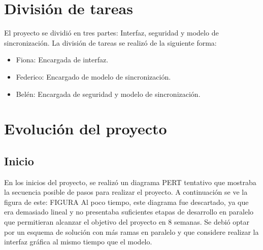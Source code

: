 \documentclass{article}
\begin{document}
\section{División de tareas}

	El proyecto se dividió en tres partes: Interfaz, seguridad y modelo de sincronización. La división de tareas se realizó de la siguiente forma:
\begin{itemize}
\item Fiona: Encargada de interfaz.
\item Federico: Encargado de modelo de sincronización.
\item Belén: Encargada de seguridad y modelo de sincronización.
\end{itemize}
\bigskip




\section{Evolución del proyecto}

\subsection{Inicio}
\smallskip

	En los inicios del proyecto, se realizó un diagrama PERT tentativo que mostraba la secuencia posible de pasos para realizar el proyecto. A continuación se ve la figura de este:
FIGURA
	Al poco tiempo, este diagrama fue descartado, ya que era demasiado lineal y no presentaba suficientes etapas de desarrollo en paralelo que permitieran alcanzar el objetivo del proyecto en 8 semanas. Se debió optar por un esquema de solución con más ramas en paralelo y que considere realizar la interfaz gráfica al mismo tiempo que el modelo.
\end{document}
